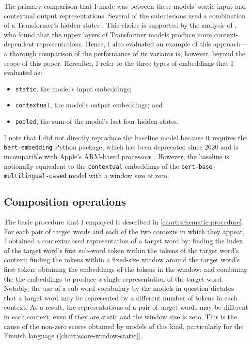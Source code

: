 The primary comparison that I made was between these models' static input and
contextual output representations.
Several of the submissions used a combination of a Transformer's hidden-states
\parencites[e.g.,][276]{Gamallo2020}[61]{CostellaPessutto2020}[145]{Hettiarachchi2020}.
This choice is supported by the analysis of \textcite{Ethayarajh2019}, who found that
the upper layers of Transformer models produce more context-dependent representations.
Hence, I also evaluated an example of this approach—a thorough comparison of the
performance of its variants is, however, beyond the scope of this paper.
Hereafter, I refer to the three types of embeddings that I evaluated as:
\begin{itemize}
  \item \texttt{static}, the model's input embeddings;
  \item \texttt{contextual}, the model's output embeddings; and
  \item \texttt{pooled}, the sum of the model's last four hidden-states.
\end{itemize}

I note that I did not directly reproduce the baseline model because it requires the
\texttt{bert-embedding} Python package, which has been deprecated since 2020 and is
incompatible with Apple's ARM-based processors \parencite{Lai2023}.
However, the baseline is notionally equivalent to the \texttt{contextual} embeddings of
the \texttt{bert-base-multilingual-cased} model with a window size of zero.

\subsection{Composition operations}

The basic procedure that I employed is described in \cref{chart:schematic-procedure}.
For each pair of target words and each of the two contexts in which they appear, I
obtained a contextualised representation of a target word by: finding the index of the
target word's first sub-word token within the tokens of the target word's context;
finding the tokens within a fixed-size window around the target word's first token;
obtaining the embeddings of the tokens in the window; and combining the the embeddings
to produce a single representation of the target word.
Notably, the use of a sub-word vocabulary by the models in question
\parencite[e.g.,][4174]{Devlin2019} dictates that a target word may be represented by a
different number of tokens in each context.
As a result, the representations of a pair of target words may be different in each
context, even if they are static and the window size is zero.
This is the cause of the non-zero scores obtained by models of this kind, particularly
for the Finnish language (\cref{chart:score-window-static}).

